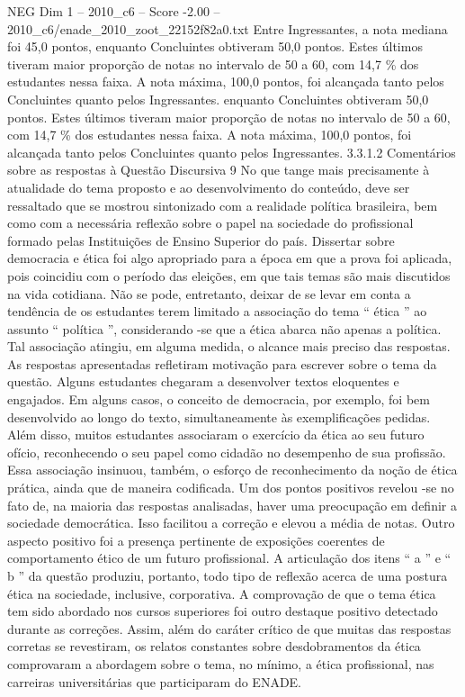 \begin{textsample}{NEG Dim 1 – 2010\_c6 – Score -2.00 – 2010\_c6/enade\_2010\_zoot\_22152f82a0.txt}
Entre Ingressantes, a nota mediana foi 45,0 pontos, enquanto Concluintes obtiveram 50,0 pontos.
Estes últimos tiveram maior proporção de notas no intervalo de 50 a 60, com 14,7 \% dos estudantes nessa faixa.
A nota máxima, 100,0 pontos, foi alcançada tanto pelos Concluintes quanto pelos Ingressantes. enquanto Concluintes obtiveram 50,0 pontos.
Estes últimos tiveram maior proporção de notas no intervalo de 50 a 60, com 14,7 \% dos estudantes nessa faixa.
A nota máxima, 100,0 pontos, foi alcançada tanto pelos Concluintes quanto pelos Ingressantes. 3.3.1.2 Comentários sobre as respostas à Questão Discursiva 9 No que tange mais precisamente à atualidade do tema proposto e ao desenvolvimento do conteúdo, deve ser ressaltado que se mostrou sintonizado com a realidade política brasileira, bem como com a necessária reflexão sobre o papel na sociedade do profissional formado pelas Instituições de Ensino Superior do país.
Dissertar sobre democracia e ética foi algo apropriado para a época em que a prova foi aplicada, pois coincidiu com o período das eleições, em que tais temas são mais discutidos na vida cotidiana.
Não se pode, entretanto, deixar de se levar em conta a tendência de os estudantes terem limitado a associação do tema “ ética ” ao assunto “ política ”, considerando -se que a ética abarca não apenas a política.
Tal associação atingiu, em alguma medida, o alcance mais preciso das respostas.
As respostas apresentadas refletiram motivação para escrever sobre o tema da questão.
Alguns estudantes chegaram a desenvolver textos eloquentes e engajados.
Em alguns casos, o conceito de democracia, por exemplo, foi bem desenvolvido ao longo do texto, simultaneamente às exemplificações pedidas.
Além disso, muitos estudantes associaram o exercício da ética ao seu futuro ofício, reconhecendo o seu papel como cidadão no desempenho de sua profissão.
Essa associação insinuou, também, o esforço de reconhecimento da noção de ética prática, ainda que de maneira codificada.
Um dos pontos positivos revelou -se no fato de, na maioria das respostas analisadas, haver uma preocupação em definir a sociedade democrática.
Isso facilitou a correção e elevou a média de notas.
Outro aspecto positivo foi a presença pertinente de exposições coerentes de comportamento ético de um futuro profissional.
A articulação dos itens “ a ” e “ b ” da questão produziu, portanto, todo tipo de reflexão acerca de uma postura ética na sociedade, inclusive, corporativa.
A comprovação de que o tema ética tem sido abordado nos cursos superiores foi outro destaque positivo detectado durante as correções.
Assim, além do caráter crítico de que muitas das respostas corretas se revestiram, os relatos constantes sobre desdobramentos da ética comprovaram a abordagem sobre o tema, no mínimo, a ética profissional, nas carreiras universitárias que participaram do ENADE.

\end{textsample}
